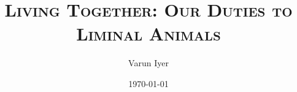 \documentclass[12pt]{book}
\author{Varun Iyer}
\date{\today}
\title{\textsc{Living Together: Our Duties to Liminal Animals}}
\begin{document}
\maketitle
\tableofcontents





\nocite{*}
\printbibliography
\end{document}
